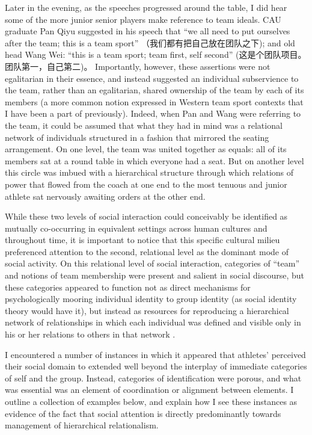 \begin{CJK}{UTF8}{gbsn}
Later in the evening, as the speeches progressed around the table, I did hear some of the more junior senior players make reference to team ideals.   CAU graduate Pan Qiyu suggested in his speech that ``we all need to put ourselves after the team; this is a team sport'' （我们都有把自己放在团队之下); and old head Wang Wei: ``this is a team sport; team first, self second'' (这是个团队项目。团队第一，自己第二)。 Importantly, however, these assertions were not egalitarian in their essence, and instead suggested an individual subservience to the team, rather than an egalitarian, shared ownership of the team by each of its members (a more common notion expressed in Western team sport contexts that I have been a part of previously).  Indeed, when Pan and Wang were referring to the team, it could be assumed that what they had in mind was a relational network of individuals structured in a fashion that mirrored the seating arrangement. On one level, the team was united together as equals: all of its members sat at a round table in which everyone had a seat. But on another level this circle was imbued with a hierarchical structure through which relations of power that flowed from the coach at one end to the most tenuous and junior athlete sat nervously awaiting orders at the other end.

While these two levels of social interaction could conceivably be identified as mutually co-occurring in equivalent settings across human cultures and throughout time, it is important to notice that this specific cultural milieu preferenced attention to the second, relational level as the dominant mode of social activity.  On this relational level of social interaction, categories of ``team'' and notions of team membership were present and salient in social discourse, but these categories appeared to function not as direct mechanisms for psychologically mooring individual identity to group identity (as social identity theory would have it), but instead as resources for reproducing a hierarchical network of relationships in which each individual was defined and visible only in his or her relations to others in that network \cite{Yuki2003}.



I encountered a number of instances in which it appeared that athletes' perceived their social domain to extended well beyond the interplay of immediate categories of self and the group.  Instead, categories of identification were porous, and what was essential was an element of coordination or alignment between elements. I outline a collection of examples below, and explain how I see these instances as evidence of the fact that social attention is directly predominantly towards management of hierarchical relationalism.


\end{CJK}
